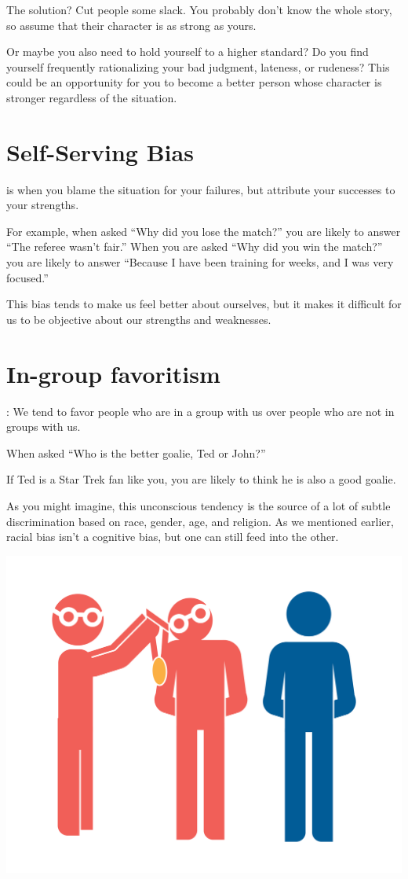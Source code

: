 The solution? Cut people some slack. You probably don't know the whole
story, so assume that their character is as strong as yours.

Or maybe you also need to hold yourself to a higher standard? Do you find
yourself frequently rationalizing your bad judgment, lateness, or
rudeness? This could be an opportunity for you to become a better
person whose character is stronger regardless of the situation.

\section{Self-Serving Bias}

 is when you blame the situation for your
failures, but attribute your successes to your strengths.

For example, when asked ``Why did you lose the match?'' you are likely
to answer ``The referee wasn't fair.''  When you are asked ``Why did
you win the match?'' you are likely to answer ``Because I have been
training for weeks, and I was very focused.''


This bias tends to make us feel better about ourselves, but it makes it
difficult for us to be objective about our strengths and weaknesses.

\section{In-group favoritism}

: We tend to favor people who are in
a group with us over people who are not in groups with us.

When asked ``Who is the better goalie, Ted or John?''

If Ted is a Star Trek fan like you, you are likely to think he is also
a good goalie.

As you might imagine, this unconscious tendency is the source of a lot
of subtle discrimination based on race, gender, age, and religion.
As we mentioned earlier, racial bias isn't a cognitive bias, but one can still feed into the other.


\includegraphics[width=.7\textwidth]{inGroupFavoritism.png}

